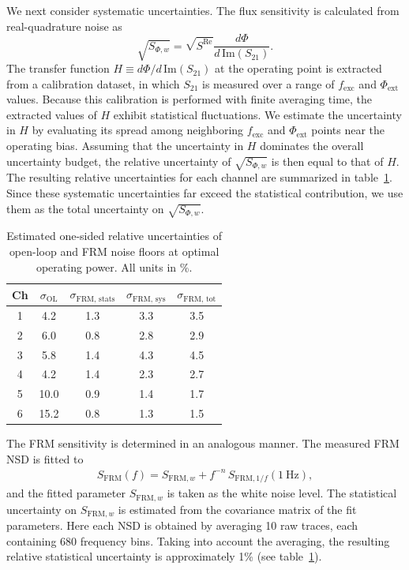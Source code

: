 \documentclass[10pt]{iopart}
\begin{document}
We next consider systematic uncertainties. The flux sensitivity is calculated from real-quadrature noise as
\begin{equation}
    \sqrt{S_{\Phi,w}} = \sqrt{S^{\text{Re}}} \frac{d\Phi}{d\,\mathrm{Im}(S_{21})}.
\end{equation}
The transfer function $H \equiv d\Phi/d\,\mathrm{Im}(S_{21})$ at the operating point is extracted from a calibration dataset, in which $S_{21}$ is measured over a range of $f_{\mathrm{exc}}$ and $\Phi_{\mathrm{ext}}$ values. Because this calibration is performed with finite averaging time, the extracted values of $H$ exhibit statistical fluctuations. We estimate the uncertainty in $H$ by evaluating its spread among neighboring $f_{\mathrm{exc}}$ and $\Phi_{\mathrm{ext}}$ points near the operating bias. Assuming that the uncertainty in $H$ dominates the overall uncertainty budget, the relative uncertainty of $\sqrt{S_{\Phi,w}}$ is then equal to that of $H$. The resulting relative uncertainties for each channel are summarized in table~\ref{tab:uncertainties}. Since these systematic uncertainties far exceed the statistical contribution, we use them as the total uncertainty on $\sqrt{S_{\Phi,w}}$.

\begin{table}[htb]
    \centering
    \begin{tabular}{c c c c c}
    \hline
         Ch & $\sigma_{\text{OL}}$ & $\sigma_{\text{FRM, stats}}$ & $\sigma_{\text{FRM, sys}}$ & $\sigma_{\text{FRM, tot}}$\\
    \hline
    1 & 4.2 & 1.3 & 3.3 & 3.5\\
    2 & 6.0 & 0.8 & 2.8 & 2.9\\
    3 & 5.8 & 1.4 & 4.3 & 4.5\\
    4 & 4.2 & 1.4 & 2.3 & 2.7\\
    5 & 10.0 & 0.9 & 1.4 & 1.7\\
    6 & 15.2 & 0.8 & 1.3 & 1.5\\
    \hline
    \end{tabular}
    \caption{Estimated one-sided relative uncertainties of open-loop and FRM noise floors at optimal operating power. All units in \%.}
    \label{tab:uncertainties}
\end{table}


The FRM sensitivity is determined in an analogous manner. The measured FRM NSD is fitted to
\begin{gather}
    S_{\mathrm{FRM}}(f) = S_{\mathrm{FRM},w} + f^{-n} \, S_{\mathrm{FRM},1/f}(1~\mathrm{Hz}),
\end{gather}
and the fitted parameter $S_{\mathrm{FRM},w}$ is taken as the white noise level. The statistical uncertainty on $S_{\mathrm{FRM},w}$ is estimated from the covariance matrix of the fit parameters. Here each NSD is obtained by averaging 10 raw traces, each containing 680 frequency bins. Taking into account the averaging, the resulting relative statistical uncertainty is approximately 1\% (see table~\ref{tab:uncertainties}).
\end{document}
